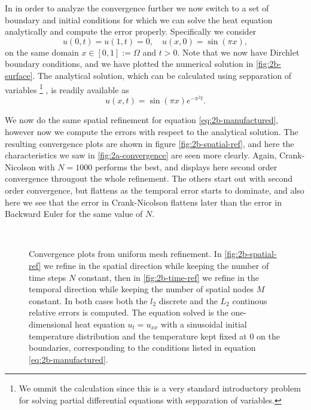 In in order to analyze the convergence further we now switch to a set of boundary and initial conditions for which we can solve the heat equation analytically and compute the error properly. 
Specifically we consider 
\begin{equation}
    u(0,t) = u(1,t) = 0, \quad u(x,0) = \sin(\pi x), 
    \label{eq:2b-manufactured}
\end{equation}
on the same domain $x \in [0,1] := \Omega$ and $t > 0$. 
Note that we now have Dirchlet boundary conditions, 
and we have plotted the numerical solution in \ref{fig:2b-surface}. 
The analytical solution, 
which can be calculated using sepparation of variables
\footnote{
    We ommit the calculation since this is a very standard introductory problem for solving 
    partial differential equations with sepparation of variables. 
} \cite{Kreyszig}, 
is readily available as
\begin{equation}
    u(x,t) = \sin(\pi x)  e^{- \pi^2 t}.
\end{equation}

We now do the same spatial refinement for equation \eqref{eq:2b-manufactured}, 
however now we compute the errors with respect to the analytical solution. 
The resulting convergence plots are shown in figure \ref{fig:2b-spatial-ref}, 
and here the characteristics we saw in \ref{fig:2a-convergence} are seen more clearly. 
Again, Crank-Nicolson with $N=1000$ performs the best, 
and displays here second order convergence througout the whole refinement. 
The others start out with second order convergence, 
but flattens as the temporal error starts to dominate, 
and also here we see that the error in Crank-Nicolson flattens later than the error in Backward Euler for the same value of $N$. 
\begin{figure}
    \centering
     \\ \medskip
    \caption{
        Convergence plots from uniform mesh refinement. 
        In \ref{fig:2b-spatial-ref} we refine in the spatial direction while keeping the number of time steps $N$ constant, 
        then in \ref{fig:2b-time-ref} we refine in the temporal direction while keeping the number of spatial nodes $M$ constant. 
        In both cases both the $l_2$ discrete and the $L_2$ continous relative errors is computed. 
        The equation solved is the one-dimensional heat equation $u_t=u_{xx}$ 
        with a sinusoidal initial temperature distribution and the temperature kept fixed at $0$ 
        on the boundaries, 
        corresponding to the conditions listed in equation \eqref{eq:2b-manufactured}. 
    }
\end{figure}

